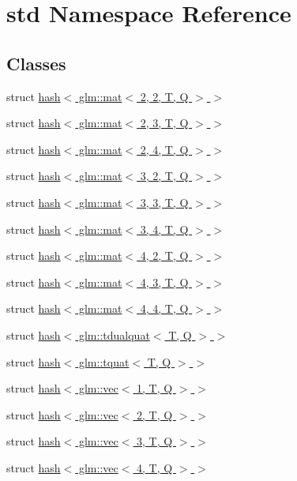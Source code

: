 \hypertarget{namespacestd}{}\section{std Namespace Reference}
\label{namespacestd}
\subsection*{Classes}
\begin{DoxyCompactItemize}
\item 
struct \hyperlink{structstd_1_1hash_3_01glm_1_1mat_3_012_00_012_00_01_t_00_01_q_01_4_01_4}{hash$<$ glm\+::mat$<$ 2, 2, T, Q $>$ $>$}
\item 
struct \hyperlink{structstd_1_1hash_3_01glm_1_1mat_3_012_00_013_00_01_t_00_01_q_01_4_01_4}{hash$<$ glm\+::mat$<$ 2, 3, T, Q $>$ $>$}
\item 
struct \hyperlink{structstd_1_1hash_3_01glm_1_1mat_3_012_00_014_00_01_t_00_01_q_01_4_01_4}{hash$<$ glm\+::mat$<$ 2, 4, T, Q $>$ $>$}
\item 
struct \hyperlink{structstd_1_1hash_3_01glm_1_1mat_3_013_00_012_00_01_t_00_01_q_01_4_01_4}{hash$<$ glm\+::mat$<$ 3, 2, T, Q $>$ $>$}
\item 
struct \hyperlink{structstd_1_1hash_3_01glm_1_1mat_3_013_00_013_00_01_t_00_01_q_01_4_01_4}{hash$<$ glm\+::mat$<$ 3, 3, T, Q $>$ $>$}
\item 
struct \hyperlink{structstd_1_1hash_3_01glm_1_1mat_3_013_00_014_00_01_t_00_01_q_01_4_01_4}{hash$<$ glm\+::mat$<$ 3, 4, T, Q $>$ $>$}
\item 
struct \hyperlink{structstd_1_1hash_3_01glm_1_1mat_3_014_00_012_00_01_t_00_01_q_01_4_01_4}{hash$<$ glm\+::mat$<$ 4, 2, T, Q $>$ $>$}
\item 
struct \hyperlink{structstd_1_1hash_3_01glm_1_1mat_3_014_00_013_00_01_t_00_01_q_01_4_01_4}{hash$<$ glm\+::mat$<$ 4, 3, T, Q $>$ $>$}
\item 
struct \hyperlink{structstd_1_1hash_3_01glm_1_1mat_3_014_00_014_00_01_t_00_01_q_01_4_01_4}{hash$<$ glm\+::mat$<$ 4, 4, T, Q $>$ $>$}
\item 
struct \hyperlink{structstd_1_1hash_3_01glm_1_1tdualquat_3_01_t_00_01_q_01_4_01_4}{hash$<$ glm\+::tdualquat$<$ T, Q $>$ $>$}
\item 
struct \hyperlink{structstd_1_1hash_3_01glm_1_1tquat_3_01_t_00_01_q_01_4_01_4}{hash$<$ glm\+::tquat$<$ T, Q $>$ $>$}
\item 
struct \hyperlink{structstd_1_1hash_3_01glm_1_1vec_3_011_00_01_t_00_01_q_01_4_01_4}{hash$<$ glm\+::vec$<$ 1, T, Q $>$ $>$}
\item 
struct \hyperlink{structstd_1_1hash_3_01glm_1_1vec_3_012_00_01_t_00_01_q_01_4_01_4}{hash$<$ glm\+::vec$<$ 2, T, Q $>$ $>$}
\item 
struct \hyperlink{structstd_1_1hash_3_01glm_1_1vec_3_013_00_01_t_00_01_q_01_4_01_4}{hash$<$ glm\+::vec$<$ 3, T, Q $>$ $>$}
\item 
struct \hyperlink{structstd_1_1hash_3_01glm_1_1vec_3_014_00_01_t_00_01_q_01_4_01_4}{hash$<$ glm\+::vec$<$ 4, T, Q $>$ $>$}
\end{DoxyCompactItemize}

